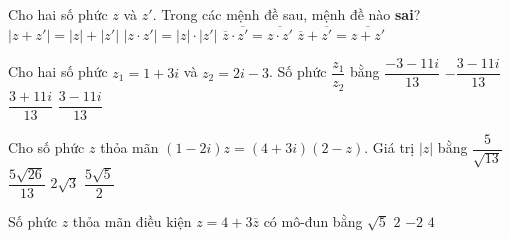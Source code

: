 \begin{ex}%
Cho hai số phức $z$ và $z'$. Trong các mệnh đề sau, mệnh đề nào {\bf sai}?
\choice
{\True $|z+z'|=| z|+| z'|$}
{$| z\cdot z'|=| z|\cdot| z'|$}
{$\overline{z}\cdot\overline{z'}=\overline{z\cdot z'}$}
{$\overline{z}+\overline{z'}=\overline{z+z'}$}
\end{ex}

\begin{ex}%
Cho hai số phức $z_1=1+3i$ và $z_2=2i-3$. Số phức $\dfrac{z_1}{z_2}$ bằng
\choice
{$\dfrac{-3-11i}{13}$}
{$-\dfrac{3-11i}{13}$}
{$\dfrac{3+11i}{13}$}
{\True $\dfrac{3-11i}{13}$}
\end{ex}

\begin{ex}%
Cho số phức $z$ thỏa mãn $(1-2i)z=(4+3i)(2-z)$. Giá trị $|z|$ bằng
\choice
{$\dfrac 5{\sqrt{13}}$}
{\True $\dfrac{5\sqrt{26}}{13}$}
{$2\sqrt 3$}
{$\dfrac{5\sqrt 5}2$}
\end{ex}

\begin{ex}%
Số phức $z$ thỏa mãn điều kiện $z=4+3\overline{z}$ có mô-đun bằng
\choice
{\True $\sqrt{5}$}
{$2$}
{$-2$}
{$4$}
\end{ex}

